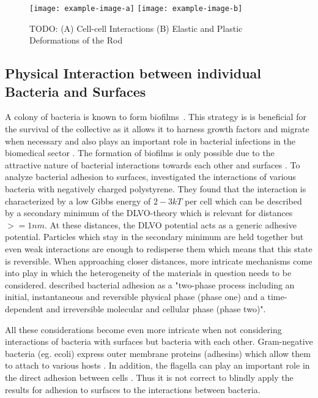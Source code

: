 \documentclass{article}
\begin{document}
\begin{figure}[H]
    \centering
    \texttt{[image: example-image-a]}
    \texttt{[image: example-image-b]}
    \caption{TODO:
        (A) Cell-cell Interactions
        (B) Elastic and Plastic Deformations of the Rod
    }
\end{figure}

\subsection{Physical Interaction between individual Bacteria and Surfaces}

A colony of bacteria is known to form biofilms~\cite{Dunne2002}.
This strategy is is beneficial for the survival of the collective as it allows it to harness growth
factors and migrate when necessary and also plays an important role in bacterial infections in the
biomedical sector \cite{Ong1999}.
The formation of biofilms is only possible due to the attractive nature of bacterial interactions
towards each other and surfaces \cite{Berne2018}.
To analyze bacterial adhesion to surfaces, \cite{vanLoosdrecht1989} investigated the interactions of
various bacteria with negatively charged polystyrene.
They found that the interaction is characterized by a low Gibbs energy of
$2-3kT$ per cell which can be described by a secondary minimum of the DLVO-theory
\cite{Derjaguin1993,Verwey1947} which is relevant for distances $>=1nm$.
At these distances, the DLVO potential acts as a generic adhesive potential.
Particles which stay in the secondary minimum are held together but even weak interactions are
enough to redisperse them which means that this state is reversible.
When approaching closer distances, more intricate mechanisms come into play in which the
heterogeneity of the materials in question needs to be considered.
\cite{Hori2010} described bacterial adhesion as a "two-phase process including an initial, instantaneous
and reversible physical phase (phase one) and a time-dependent and irreversible molecular and
cellular phase (phase two)".

All these considerations become even more intricate when not considering interactions of bacteria
with surfaces but bacteria with each other.
Gram-negative bacteria (eg. \ac{ecoli}) express outer membrane proteins (adhesins) which allow them
to attach to various hosts \cite{Vaca2019,Beachey1981}.
In addition, the flagella can play an important role in the direct adhesion between cells
\cite{Haiko2013}.
Thus it is not correct to blindly apply the results for adhesion to surfaces to the interactions
between bacteria.
\end{document}
